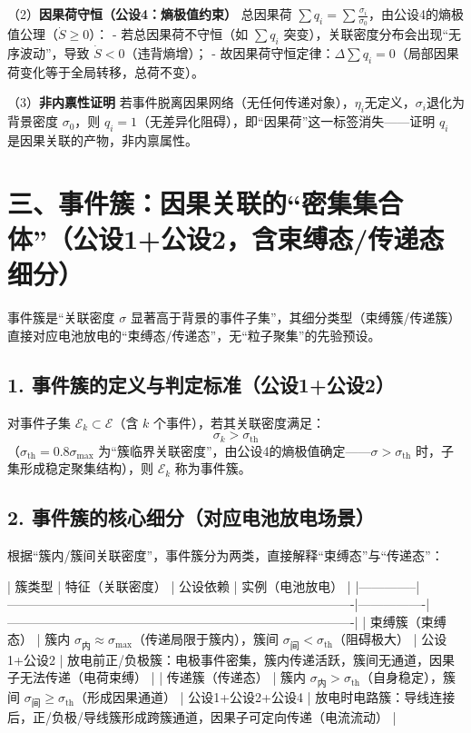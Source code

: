 \documentclass{article}
\begin{document}
（2）\textbf{因果荷守恒（公设4：熵极值约束）}  
总因果荷 $\sum q_i = \sum \frac{\sigma_i}{\sigma_0}$，由公设4的熵极值公理（$\dot{S} \geq 0$）：  
- 若总因果荷不守恒（如 $\sum q_i$ 突变），关联密度分布会出现“无序波动”，导致 $\dot{S} < 0$（违背熵增）；  
- 故因果荷守恒定律：$\boxed{\Delta \sum q_i = 0}$（局部因果荷变化等于全局转移，总荷不变）。

（3）\textbf{非内禀性证明}  
若事件脱离因果网络（无任何传递对象），$\eta_i$无定义，$\sigma_i$退化为背景密度 $\sigma_0$，则 $q_i = 1$（无差异化阻碍），即“因果荷”这一标签消失——证明 $q_i$ 是因果关联的产物，非内禀属性。


\section*{三、事件簇：因果关联的“密集集合体”（公设1+公设2，含束缚态/传递态细分）}
事件簇是“关联密度 $\sigma$ 显著高于背景的事件子集”，其细分类型（束缚簇/传递簇）直接对应电池放电的“束缚态/传递态”，无“粒子聚集”的先验预设。

\subsection*{1. 事件簇的定义与判定标准（公设1+公设2）}
对事件子集 $\mathcal{E}_k \subset \mathcal{E}$（含 $k$ 个事件），若其关联密度满足：
\[
\boxed{\sigma_k > \sigma_{\text{th}}}
\]
（$\sigma_{\text{th}} = 0.8\sigma_{\text{max}}$ 为“簇临界关联密度”，由公设4的熵极值确定——$\sigma > \sigma_{\text{th}}$ 时，子集形成稳定聚集结构），则 $\mathcal{E}_k$ 称为事件簇。

\subsection*{2. 事件簇的核心细分（对应电池放电场景）}
根据“簇内/簇间关联密度”，事件簇分为两类，直接解释“束缚态”与“传递态”：

| 簇类型       | 特征（关联密度）                                                                 | 公设依赖       | 实例（电池放电）                                                                 |
|--------------|----------------------------------------------------------------------------------|----------------|----------------------------------------------------------------------------------|
| 束缚簇（束缚态） | 簇内 $\sigma_{\text{内}} \approx \sigma_{\text{max}}$（传递局限于簇内），簇间 $\sigma_{\text{间}} < \sigma_{\text{th}}$（阻碍极大） | 公设1+公设2    | 放电前正/负极簇：电极事件密集，簇内传递活跃，簇间无通道，因果子无法传递（电荷束缚） |
| 传递簇（传递态） | 簇内 $\sigma_{\text{内}} > \sigma_{\text{th}}$（自身稳定），簇间 $\sigma_{\text{间}} \geq \sigma_{\text{th}}$（形成因果通道） | 公设1+公设2+公设4 | 放电时电路簇：导线连接后，正/负极/导线簇形成跨簇通道，因果子可定向传递（电流流动） |
\end{document}
